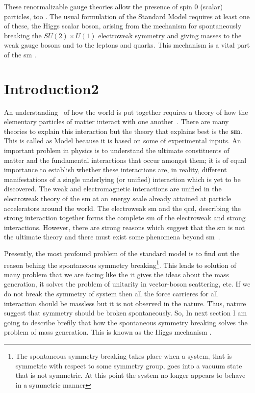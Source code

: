 These renormalizable gauge theories allow the presence of spin 0 (scalar) particles, too \cite{article:higgs}. The usual formulation of the Standard Model requires at least one of these, the Higgs scalar boson, arising from the mechanism for spontaneously breaking the $SU(2)\times U(1)$ electroweak symmetry and giving masses to the weak gauge bosons and to the leptons and quarks. This mechanism is a vital part of the {sm} \cite{book:barger, book:Braibant, book:FrankClose, book:Griffiths}.


\section{Introduction2}
An understanding~\cite{Chatrchyan:2012xdj} of how the world is put together requires a theory of how the elementary particles of matter interact with one another~\cite{paper:ScientificAmericantHooft}. There are many theories to explain this interaction but the theory that explains best is the {\bf {sm}}. This is called as Model because it is based on some of experimental inputs. An important problem in physics is to understand the ultimate constituents of matter and the fundamental interactions that occur amongst them; it is of equal importance to establish whether these interactions are, in reality, different manifestations of a single underlying (or unified) interaction which is yet to be discovered. The weak and electromagnetic interactions are unified in the electroweak theory of the {sm} at an energy scale already attained at particle accelerators around the world. The electroweak {sm} and the  {qcd}, describing the strong interaction together forms the complete {sm} of the electroweak and strong interactions. However, there are strong reasons which suggest that the {sm} is not the ultimate theory and there must exist some phenomena beyond {sm}~\cite{paper:ScientificAmericanChrisQuiggEPF, article:PAdventure}.  

Presently, the most profound problem of the standard model is to find out the reason behing the spontaneous symmetry breaking\footnote{The spontaneous symmetry breaking takes place when a system, that is symmetric with respect to some symmetry group, goes into a vacuum state that is not symmetric. At this point the system no longer appears to behave in a symmetric manner}. This leads to solution of many problem that we are facing like the it gives the ideas about the mass generation, it solves the problem of unitarity in vector-boson scattering, etc. If we do not break the symmetry of system then all the force carrieres for all interaction should be massless but it is not observed in the nature. Thus, nature suggest that symmetry should be broken spontaneously. So, In next section I am going to describe brefily that how the spontaneous symmetry breaking solves the problem of mass generation. This is known as the Higgs mechanism \cite{article:higgs, article:Englert, article:kibble}.

